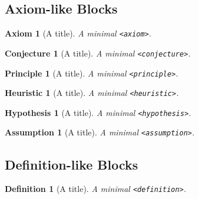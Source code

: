 \documentclass{sn-jnl}
\theoremstyle{thmstyleone}%
\newtheorem{conjecture}[theorem]{Conjecture}
\theoremstyle{thmstyletwo}%
\newtheorem{definition}[theorem]{Definition}
\newtheorem{axiom}[theorem]{Axiom}
\newtheorem{principle}[theorem]{Principle}
\newtheorem{heuristic}[theorem]{Heuristic}
\newtheorem{hypothesis}[theorem]{Hypothesis}
\newtheorem{assumption}[theorem]{Assumption}
\theoremstyle{thmstylethree}%
\newcommand{\mono}[1]{\texttt{#1}}
\numberwithin{equation}{section}
\begin{document}
\subsection{Axiom-like Blocks}\label{block-samples-axiom-like}%
\begin{axiom}[A title]\label{block-samples-axiom-like-2}%
%
A minimal \mono{<axiom>}.%
\end{axiom}
\begin{conjecture}[A title]\label{block-samples-axiom-like-3}%
%
A minimal \mono{<conjecture>}.%
\end{conjecture}
\begin{principle}[A title]\label{block-samples-axiom-like-4}%
%
A minimal \mono{<principle>}.%
\end{principle}
\begin{heuristic}[A title]\label{block-samples-axiom-like-5}%
%
A minimal \mono{<heuristic>}.%
\end{heuristic}
\begin{hypothesis}[A title]\label{block-samples-axiom-like-6}%
%
A minimal \mono{<hypothesis>}.%
\end{hypothesis}
\begin{assumption}[A title]\label{block-samples-axiom-like-7}%
%
A minimal \mono{<assumption>}.%
\end{assumption}
%
%
\typeout{************************************************}
\typeout{************************************************}
%
\subsection{Definition-like Blocks}\label{block-samples-definition-like}%
\begin{definition}[A title]\label{block-samples-definition-like-2}%
%
A minimal \mono{<definition>}.%
\end{definition}
%
%
\typeout{************************************************}
\typeout{************************************************}
%
\end{document}
